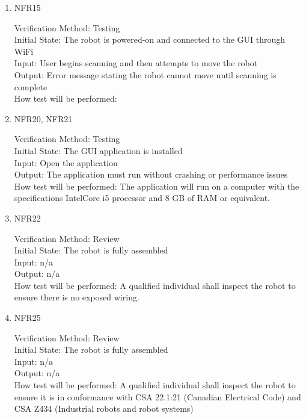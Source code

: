 \documentclass[12pt, titlepage]{article}
\begin{document}
\begin{enumerate}
\item{NFR15\\}

Verification Method: Testing\\					
Initial State: 	The robot is powered-on and connected to the GUI through WiFi	\\
Input: User begins scanning and then attempts to move the robot\\
Output: Error message stating the robot cannot move until scanning is complete\\
How test will be performed:

\item{NFR20, NFR21\\}

Verification Method: Testing\\					
Initial State:  The GUI application is installed\\ 
Input: Open the application\\
Output: The application must run without crashing or performance issues\\
How test will be performed: The application will run on a computer with the specifications IntelCore i5 processor and 8 GB of RAM or equivalent.\\

\item{NFR22\\}

Verification Method: Review\\					
Initial State:  The robot is fully assembled\\
Input: n/a\\
Output: n/a\\
How test will be performed: A qualified individual shall inspect the robot to ensure there is no exposed wiring.\\


\item{NFR25\\}

Verification Method: Review\\					
Initial State:  The robot is fully assembled\\
Input: n/a\\
Output: n/a\\
How test will be performed: A qualified individual shall inspect the robot to ensure it is in conformance with CSA 22.1:21 (Canadian Electrical Code) \cite{CSA1} and CSA Z434 (Industrial robots and robot systems) \cite{CSA2}\\

\end{enumerate}
\end{document}
